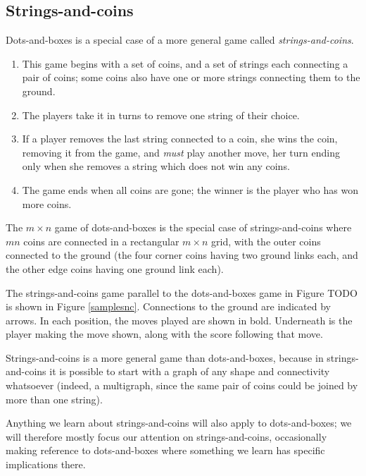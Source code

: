 \documentclass[a4paper,twocolumn]{article}
\begin{document}
\subsection{Strings-and-coins}

Dots-and-boxes is a special case of a more general game called
\emph{strings-and-coins}.

\begin{enumerate}
  \item This game begins with a set of coins, and a set of strings
    each connecting a pair of coins; some coins also have one or more
    strings connecting them to the ground.
  \item The players take it in turns to remove one string of their
    choice.
  \item If a player removes the last string connected to a coin, she
    wins the coin, removing it from the game, and \emph{must} play
    another move, her turn ending only when she removes a string which
    does not win any coins.
  \item The game ends when all coins are gone; the winner is the
    player who has won more coins.
\end{enumerate}

The $m \times n$ game of dots-and-boxes is the special case of
strings-and-coins where $mn$ coins are connected in a rectangular $m
\times n$ grid, with the outer coins connected to the ground (the four
corner coins having two ground links each, and the other edge coins
having one ground link each).

The strings-and-coins game parallel to the dots-and-boxes game in
Figure TODO is shown in Figure \ref{samplesnc}. Connections to the
ground are indicated by arrows. In each position, the moves played are
shown in bold. Underneath is the player making the move shown, along
with the score following that move.

\begin{figure*}
  \centering
  \def\svgscale{0.7}
  
  \caption{Sample strings-and-coins game}
  \label{samplesnc}
\end{figure*}

Strings-and-coins is a more general game than dots-and-boxes, because
in strings-and-coins it is possible to start with a graph of any shape
and connectivity whatsoever (indeed, a multigraph, since the same pair
of coins could be joined by more than one string).

Anything we learn about strings-and-coins will also apply to
dots-and-boxes; we will therefore mostly focus our attention on
strings-and-coins, occasionally making reference to dots-and-boxes
where something we learn has specific implications there.
\end{document}
